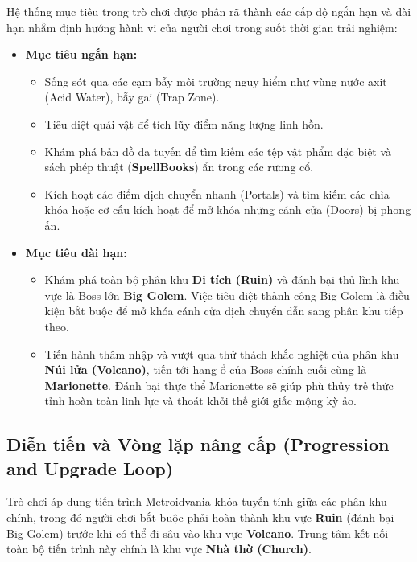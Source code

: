 \documentclass[../DoAn.tex]{subfiles}
\begin{document}
Hệ thống mục tiêu trong trò chơi được phân rã thành các cấp độ ngắn hạn và dài hạn nhằm định hướng hành vi của người chơi trong suốt thời gian trải nghiệm:
\begin{itemize}
    \item \textbf{Mục tiêu ngắn hạn:} 
    \begin{itemize}
        \item Sống sót qua các cạm bẫy môi trường nguy hiểm như vùng nước axit (Acid Water), bẫy gai (Trap Zone).
        \item Tiêu diệt quái vật để tích lũy điểm năng lượng linh hồn.
        \item Khám phá bản đồ đa tuyến để tìm kiếm các tệp vật phẩm đặc biệt và sách phép thuật (\textbf{SpellBooks}) ẩn trong các rương cổ.
        \item Kích hoạt các điểm dịch chuyển nhanh (Portals) và tìm kiếm các chìa khóa hoặc cơ cấu kích hoạt để mở khóa những cánh cửa (Doors) bị phong ấn.
    \end{itemize}
    \item \textbf{Mục tiêu dài hạn:} 
    \begin{itemize}
        \item Khám phá toàn bộ phân khu \textbf{Di tích (Ruin)} và đánh bại thủ lĩnh khu vực là Boss lớn \textbf{Big Golem}. Việc tiêu diệt thành công Big Golem là điều kiện bắt buộc để mở khóa cánh cửa dịch chuyển dẫn sang phân khu tiếp theo.
        \item Tiến hành thâm nhập và vượt qua thử thách khắc nghiệt của phân khu \textbf{Núi lửa (Volcano)}, tiến tới hang ổ của Boss chính cuối cùng là \textbf{Marionette}. Đánh bại thực thể Marionette sẽ giúp phù thủy trẻ thức tỉnh hoàn toàn linh lực và thoát khỏi thế giới giấc mộng kỳ ảo.
    \end{itemize}
\end{itemize}

\subsection{Diễn tiến và Vòng lặp nâng cấp (Progression and Upgrade Loop)}
\label{subsection:3.2.3}

Trò chơi áp dụng tiến trình Metroidvania khóa tuyến tính giữa các phân khu chính, trong đó người chơi bắt buộc phải hoàn thành khu vực \textbf{Ruin} (đánh bại Big Golem) trước khi có thể đi sâu vào khu vực \textbf{Volcano}. Trung tâm kết nối toàn bộ tiến trình này chính là khu vực \textbf{Nhà thờ (Church)}.
\end{document}
